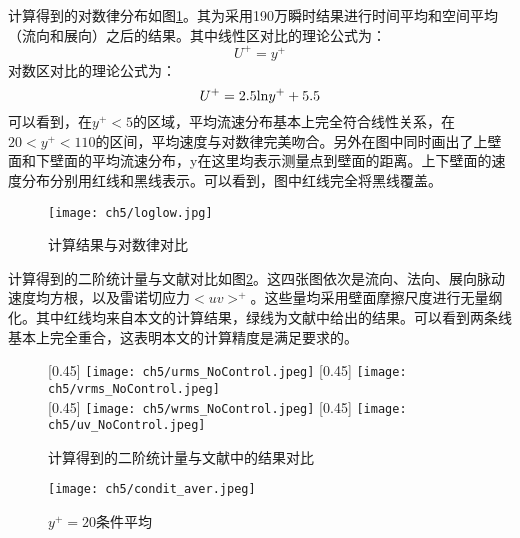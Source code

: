 计算得到的对数律分布如图\ref{f:loglow}。其为采用190万瞬时结果进行时间平均和空间平均（流向和展向）之后的结果。其中线性区对比的理论公式为：
\begin{equation}\label{e:linear_region}
  U^+=y^+
\end{equation}
对数区对比的理论公式为：
\begin{equation}\label{e:loglaw}
  U^+=2.5{\rm ln}y^++5.5
\end{equation}
可以看到，在$y^+<5$的区域，平均流速分布基本上完全符合线性关系，在$20<y^+<110$的区间，平均速度与对数律完美吻合。另外在图中同时画出了上壁面和下壁面的平均流速分布，y在这里均表示测量点到壁面的距离。上下壁面的速度分布分别用红线和黑线表示。可以看到，图中红线完全将黑线覆盖。
\begin{figure}[htb]
  \centering
  \texttt{[image: ch5/loglow.jpg]}
  \caption{计算结果与对数律对比}\label{f:loglow}
\end{figure}

计算得到的二阶统计量与文献对比如图\ref{f:2orderaver}。这四张图依次是流向、法向、展向脉动速度均方根，以及雷诺切应力$<uv>^+$。这些量均采用壁面摩擦尺度进行无量纲化。其中红线均来自本文的计算结果，绿线为文献\cite{Kim1987}中给出的结果。可以看到两条线基本上完全重合，这表明本文的计算精度是满足要求的。
\begin{figure}[htb]
  \centering
  [0.45\textwidth] %
    {\texttt{[image: ch5/urms\_NoControl.jpeg]}}%
  [0.45\textwidth]
    {\texttt{[image: ch5/vrms\_NoControl.jpeg]}}%
  \\\bigskip
  [0.45\textwidth] %
    {\texttt{[image: ch5/wrms\_NoControl.jpeg]}}%
  [0.45\textwidth]
    {\texttt{[image: ch5/uv\_NoControl.jpeg]}}%
  \caption{计算得到的二阶统计量与文献中的结果对比}\label{f:2orderaver}
\end{figure}
\begin{figure}[htb]
  \centering
  \texttt{[image: ch5/condit\_aver.jpeg]}
  \caption{$y^+=20$条件平均}\label{f:base_condition_average}
\end{figure}

